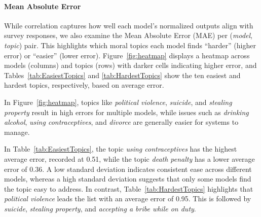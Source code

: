\documentclass[11pt]{article}
\begin{document}
\paragraph{Mean Absolute Error} While correlation captures how well each model’s normalized outputs align with survey responses, we also examine the Mean Absolute Error (MAE) per (\textit{model}, \textit{topic}) pair. This highlights which moral topics each model finds “harder” (higher error) or “easier” (lower error). Figure~\ref{fig:heatmap} displays a heatmap across models (columns) and topics (rows) with darker cells indicating higher error, and Tables~\ref{tab:EasiestTopics} and \ref{tab:HardestTopics} show the ten easiest and hardest topics, respectively, based on average error. 

In Figure~\ref{fig:heatmap}, topics like \emph{political violence}, \emph{suicide}, and \emph{stealing property} result in high errors for multiple models, while issues such as \emph{drinking alcohol}, \emph{using contraceptives}, and \emph{divorce} are generally easier for systems to manage.

In Table~\ref{tab:EasiestTopics}, the topic \emph{using contraceptives} has the highest average error, recorded at 0.51, while the topic \emph{death penalty} has a lower average error of 0.36. A low standard deviation indicates consistent ease across different models, whereas a high standard deviation suggests that only some models find the topic easy to address. In contrast, Table~\ref{tab:HardestTopics} highlights that \emph{political violence} leads the list with an average error of 0.95. This is followed by \emph{suicide}, \emph{stealing property}, and \emph{accepting a bribe while on duty}.
\end{document}
